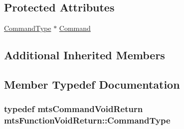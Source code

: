 \subsection*{Protected Attributes}
\begin{DoxyCompactItemize}
\item 
\hyperlink{classmts_function_void_return_a8aa3dea44f20057e4f47cbb20de87365}{Command\-Type} $\ast$ \hyperlink{classmts_function_void_return_a8a5d1544b3dd7fabb94e62dce744c9b2}{Command}
\end{DoxyCompactItemize}
\subsection*{Additional Inherited Members}


\subsection{Member Typedef Documentation}
\hypertarget{classmts_function_void_return_a8aa3dea44f20057e4f47cbb20de87365}{
\subsubsection[{Command\-Type}]{\setlength{\rightskip}{0pt plus 5cm}typedef {\bf mts\-Command\-Void\-Return} {\bf mts\-Function\-Void\-Return\-::\-Command\-Type}}}\label{classmts_function_void_return_a8aa3dea44f20057e4f47cbb20de87365}



